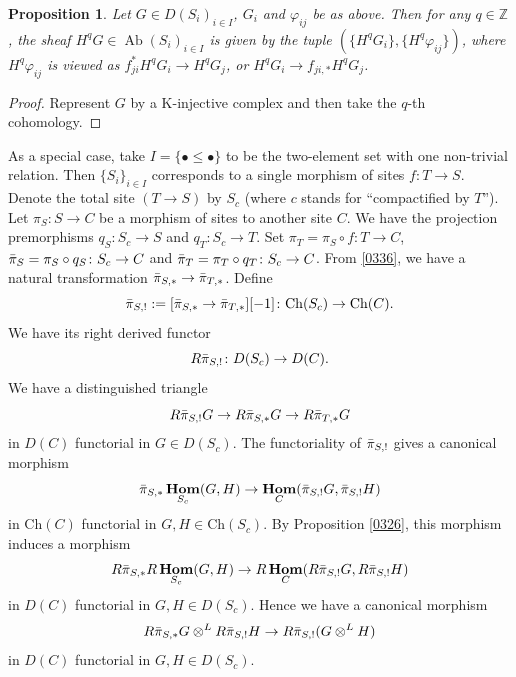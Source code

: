 \documentclass{amsart}
\newtheorem{Prop}[Thm]{Proposition}
\theoremstyle{remark}
\numberwithin{equation}{subsection}
\newcommand{\compose}{\mathbin{\circ}}
\newcommand{\tensor}{\mathbin{\otimes}}
\newcommand{\Z}{\mathbb{Z}}
\newcommand{\alg}[1]{\mathbf{#1}}
\newcommand{\Ch}{\mathrm{Ch}}
\DeclareMathOperator{\Ab}{Ab}
\DeclareMathOperator{\sheafhom}{\alg{Hom}}
\begin{document}
\begin{Prop} \label{0352}
	Let $G \in D(S_{i})_{i \in I}$, $G_{i}$ and $\varphi_{i j}$ be as above.
	Then for any $q \in \Z$, the sheaf $H^{q} G \in \Ab(S_{i})_{i \in I}$ is given by the tuple
	$(\{H^{q} G_{i}\}, \{H^{q} \varphi_{i j}\})$,
	where $H^{q} \varphi_{i j}$ is viewed as $f_{j i}^{\ast} H^{q} G_{i} \to H^{q} G_{j}$,
	or $H^{q} G_{i} \to f_{j i, \ast} H^{q} G_{j}$.
\end{Prop}

\begin{proof}
	Represent $G$ by a K-injective complex and then take the $q$-th cohomology.
\end{proof}

As a special case, take $I = \{\bullet \le \bullet\}$ to be
the two-element set with one non-trivial relation.
Then $\{S_{i}\}_{i \in I}$ corresponds to a single morphism of sites $f \colon T \to S$.
Denote the total site $(T \to S)$ by $S_{c}$
(where $c$ stands for ``compactified by $T$'').
Let $\pi_{S} \colon S \to C$ be a morphism of sites to another site $C$.
We have the projection premorphisms
$q_{S} \colon S_{c} \to S$ and $q_{T} \colon S_{c} \to T$.
Set $\pi_{T} = \pi_{S} \compose f \colon T \to C$,
$\Bar{\pi}_{S} = \pi_{S} \compose q_{S} \colon S_{c} \to C$
and $\Bar{\pi}_{T} = \pi_{T} \compose q_{T} \colon S_{c} \to C$.
From \eqref{0336}, we have a natural transformation
$\Bar{\pi}_{S, \ast} \to \Bar{\pi}_{T, \ast}$.
Define
	\begin{equation} \label{0386}
			\Bar{\pi}_{S, !}
		:=
			[\Bar{\pi}_{S, \ast} \to \Bar{\pi}_{T, \ast}][-1]
		\colon
			\Ch(S_{c})
		\to
			\Ch(C).
	\end{equation}
We have its right derived functor
	\begin{equation} \label{0334}
			R \Bar{\pi}_{S, !}
		\colon
			D(S_{c})
		\to
			D(C).
	\end{equation}
We have a distinguished triangle
	\[
			R \Bar{\pi}_{S, !} G
		\to
			R \Bar{\pi}_{S, \ast} G
		\to
			R \Bar{\pi}_{T, \ast} G
	\]
in $D(C)$ functorial in $G \in D(S_{c})$.
The functoriality of $\Bar{\pi}_{S, !}$ gives a canonical morphism
	\[
			\Bar{\pi}_{S, \ast} \sheafhom_{S_{c}}(G, H)
		\to
			\sheafhom_{C}(\Bar{\pi}_{S, !} G, \Bar{\pi}_{S, !} H)
	\]
in $\Ch(C)$ functorial in $G, H \in \Ch(S_{c})$.
By Proposition \ref{0326}, this morphism induces a morphism
	\[
			R \Bar{\pi}_{S, \ast} R \sheafhom_{S_{c}}(G, H)
		\to
			R \sheafhom_{C}(R \Bar{\pi}_{S, !} G, R \Bar{\pi}_{S, !} H)
	\]
in $D(C)$ functorial in $G, H \in D(S_{c})$.
Hence we have a canonical morphism
	\begin{equation} \label{0328}
			R \Bar{\pi}_{S, \ast} G \tensor^{L} R \Bar{\pi}_{S, !} H
		\to
			R \Bar{\pi}_{S, !}(G \tensor^{L} H)
	\end{equation}
in $D(C)$ functorial in $G, H \in D(S_{c})$.
\end{document}
